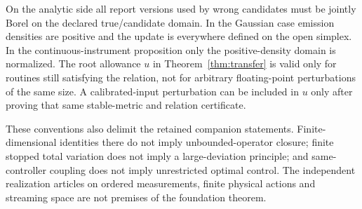 On the analytic side all report versions used by wrong candidates must be jointly Borel on the declared true/candidate domain. In the Gaussian case emission densities are positive and the update is everywhere defined on the open simplex. In the continuous-instrument proposition only the positive-density domain is normalized. The root allowance $u$ in Theorem~\ref{thm:transfer} is valid only for routines still satisfying the relation, not for arbitrary floating-point perturbations of the same size. A calibrated-input perturbation can be included in $u$ only after proving that same stable-metric and relation certificate.

These conventions also delimit the retained companion statements. Finite-dimensional identities there do not imply unbounded-operator closure; finite stopped total variation does not imply a large-deviation principle; and same-controller coupling does not imply unrestricted optimal control. The independent realization articles on ordered measurements, finite physical actions and streaming space are not premises of the foundation theorem.
